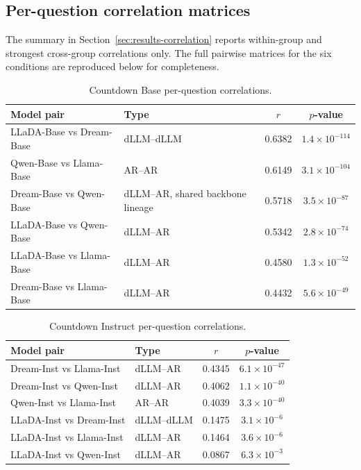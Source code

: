 \FloatBarrier
\subsection{Per-question correlation matrices}
\label{sec:appendix-correlation}

The summary in Section~\ref{sec:results-correlation} reports within-group and strongest cross-group correlations only. The full pairwise matrices for the six conditions are reproduced below for completeness.

\begin{table}[H]
\centering
\caption{Countdown Base per-question correlations.}
\label{tab:countdown-base-corr}
\scriptsize
\begin{tabular}{llcc}
\toprule
\textbf{Model pair} & \textbf{Type} & \textbf{$r$} & \textbf{$p$-value} \\
\midrule
LLaDA-Base vs Dream-Base & dLLM--dLLM & 0.6382 & $1.4\times10^{-114}$ \\
Qwen-Base vs Llama-Base & AR--AR & 0.6149 & $3.1\times10^{-104}$ \\
Dream-Base vs Qwen-Base & dLLM--AR, shared backbone lineage & 0.5718 & $3.5\times10^{-87}$ \\
LLaDA-Base vs Qwen-Base & dLLM--AR & 0.5342 & $2.8\times10^{-74}$ \\
LLaDA-Base vs Llama-Base & dLLM--AR & 0.4580 & $1.3\times10^{-52}$ \\
Dream-Base vs Llama-Base & dLLM--AR & 0.4432 & $5.6\times10^{-49}$ \\
\bottomrule
\end{tabular}
\end{table}

\begin{table}[H]
\centering
\caption{Countdown Instruct per-question correlations.}
\label{tab:countdown-inst-corr}
\scriptsize
\begin{tabular}{llcc}
\toprule
\textbf{Model pair} & \textbf{Type} & \textbf{$r$} & \textbf{$p$-value} \\
\midrule
Dream-Inst vs Llama-Inst & dLLM--AR & 0.4345 & $6.1\times10^{-47}$ \\
Dream-Inst vs Qwen-Inst & dLLM--AR & 0.4062 & $1.1\times10^{-40}$ \\
Qwen-Inst vs Llama-Inst & AR--AR & 0.4039 & $3.3\times10^{-40}$ \\
LLaDA-Inst vs Dream-Inst & dLLM--dLLM & 0.1475 & $3.1\times10^{-6}$ \\
LLaDA-Inst vs Llama-Inst & dLLM--AR & 0.1464 & $3.6\times10^{-6}$ \\
LLaDA-Inst vs Qwen-Inst & dLLM--AR & 0.0867 & $6.3\times10^{-3}$ \\
\bottomrule
\end{tabular}
\end{table}

